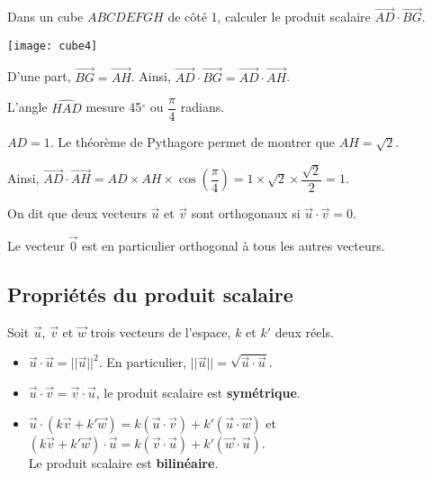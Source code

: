 \documentclass[11pt,fleqn, openany]{book} %
\begin{document}
\begin{example} Dans un cube $ABCDEFGH$ de côté 1, calculer le produit scalaire $\overrightarrow{AD} \cdot \overrightarrow{BG}$.

\begin{minipage}{0.3\linewidth}
\begin{center}
\texttt{[image: cube4]}
\end{center}
\end{minipage}\hfill\begin{minipage}{0.65\linewidth}
D'une part, $\overrightarrow{BG}=\overrightarrow{AH}$. Ainsi, $\overrightarrow{AD} \cdot \overrightarrow{BG} = \overrightarrow{AD} \cdot \overrightarrow{AH}$.

L'angle $\widehat{HAD}$ mesure 45$^\circ$ ou $\dfrac{\pi}{4}$ radians.

$AD=1$. Le théorème de Pythagore permet de montrer que $AH=\sqrt{2}$.

Ainsi, $\overrightarrow{AD} \cdot \overrightarrow{AH}= AD \times AH \times \cos \left( \dfrac{\pi}{4}\right) = 1 \times \sqrt{2} \times \dfrac{\sqrt{2}}{2}=1$.
\end{minipage}

\end{example}

\begin{definition}On dit que deux vecteurs $\vec u$ et $\vec v$ sont orthogonaux si $\vec u \cdot \vec v=0$.
\end{definition}

Le vecteur $\vec 0$ est en particulier orthogonal à tous les autres vecteurs.

\newpage
\subsection{Propriétés du produit scalaire}

\begin{proposition}Soit $\vec u$, $\vec v$ et $\vec w$ trois vecteurs de l'espace, $k$ et $k'$ deux réels.
\begin{itemize}
\item $\vec u \cdot \vec u = \lvert\lvert \vec u\rvert\rvert^2$. En particulier, $\lvert\lvert\vec u\rvert\rvert=\sqrt{\vec u \cdot \vec u}$.
\item $\vec u \cdot \vec v = \vec v \cdot \vec u$, le produit scalaire est \textbf{symétrique}.
\item $\vec u \cdot ( k \vec v + k' \vec w)= k (\vec u \cdot \vec v) + k' (\vec u \cdot \vec w)$ et $( k \vec v + k' \vec w)\cdot \vec u= k (\vec v \cdot \vec u) + k' (\vec w \cdot \vec u)$. \\Le produit scalaire est \textbf{bilinéaire}.
\end{itemize}\end{proposition}
\end{document}
